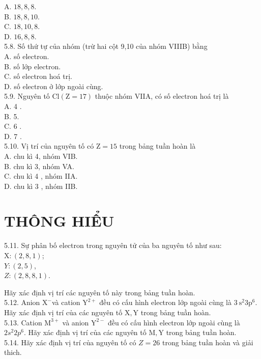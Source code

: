 \documentclass[10pt]{article}
\begin{document}
A. $18,8,8$.\\
B. $18,8,10$.\\
C. $18,10,8$.\\
D. $16,8,8$.\\
5.8. Số thứ tự của nhóm (trừ hai cột 9,10 của nhóm VIIIB) bằng\\
A. số electron.\\
B. số lớp electron.\\
C. số electron hoá trị.\\
D. số electron ở lớp ngoài cùng.\\
5.9. Nguyên tố $\mathrm{Cl}(\mathrm{Z}=17)$ thuộc nhóm VIIA, có số electron hoá trị là\\
A. 4 .\\
B. 5.\\
C. 6 .\\
D. 7 .\\
5.10. Vị trí của nguyên tố có $\mathrm{Z}=15$ trong bảng tuần hoàn là\\
A. chu kì 4, nhóm VIB.\\
B. chu kì 3, nhóm VA.\\
C. chu kì 4 , nhóm IIA.\\
D. chu kì 3 , nhóm IIB.

\section*{THÔNG HIỂU}
5.11. Sự phân bố electron trong nguyên tử của ba nguyên tố như sau:\\
$\mathrm{X}:(2,8,1)$;\\
$Y:(2,5)$,\\
$Z:(2,8,8,1)$.

Hãy xác định vị trí các nguyên tố này trong bảng tuần hoàn.\\
5.12. Anion $\mathrm{X}^{-}$và cation $\mathrm{Y}^{2+}$ đều có cấu hình electron lớp ngoài cùng là $3 \mathrm{~s}^{2} 3 \mathrm{p}^{6}$. Hãy xác định vị trí của các nguyên tố $\mathrm{X}, \mathrm{Y}$ trong bảng tuần hoàn.\\
5.13. Cation $\mathrm{M}^{3+}$ và anion $\mathrm{Y}^{2-}$ đều có cấu hình electron lớp ngoài cùng là $2 s^{2} 2 p^{6}$. Hãy xác định vị trí của các nguyên tố $\mathrm{M}, \mathrm{Y}$ trong bảng tuần hoàn.\\
5.14. Hãy xác định vị trí của nguyên tố có $Z=26$ trong bảng tuần hoàn và giải thich.
\end{document}
